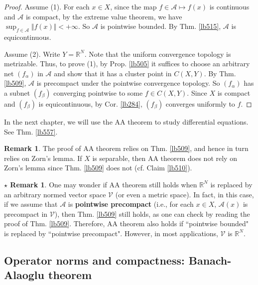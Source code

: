 \documentclass[12pt,b5paper,notitlepage]{article}
\theoremstyle{definition}
\newtheorem{rem}[df]{Remark}
\newtheorem{srem}[df]{$\star$ Remark}
\theoremstyle{plain}
\newcommand{\mc}{\mathcal}
\newcommand{\scr}{\mathscr}
\newcommand{\Rbb}{\mathbb R}
\numberwithin{equation}{section}
\begin{document}


\begin{proof}
Assume (1). For each $x\in X$, since the map $f\in\scr A\mapsto f(x)$ is continuous and $\scr A$ is compact, by the extreme value theorem, we have $\sup_{f\in\scr A}\Vert f(x)\Vert<+\infty$. So $\scr A$ is pointwise bounded. By Thm. \ref{lb515}, $\scr A$ is equicontinuous.

Assume (2). Write $Y=\Rbb^N$. Note that the uniform convergence topology is metrizable. Thus, to prove (1), by Prop. \ref{lb505} it suffices to choose an arbitrary net $(f_\alpha)$ in $\scr A$ and show that it has a cluster point in $C(X,Y)$. By Thm. \ref{lb509}, $\scr A$ is precompact under the pointwise convergence topology. So $(f_\alpha)$ has a subnet $(f_\beta)$ converging pointwise to some $f\in C(X,Y)$. Since $X$ is compact and $(f_\beta)$ is equicontinuous, by Cor. \ref{lb284}, $(f_\beta)$ converges uniformly to $f$. 
\end{proof}


In the next chapter, we will use the AA theorem to study differential equations. See Thm. \ref{lb557}.


\begin{rem}
The proof of AA theorem relies on Thm. \ref{lb509}, and hence in turn relies on Zorn's lemma. If $X$ is separable, then AA theorem does not rely on Zorn's lemma since Thm. \ref{lb509} does not (cf. Claim \ref{lb510}).
\end{rem}

\begin{srem}
One may wonder if AA theorem still holds when $\Rbb^N$ is replaced by an arbitrary normed vector space $\mc V$ (or even a metric space). In fact, in this case, if we assume that $\scr A$ is \textbf{pointwise precompact} (i.e., for each $x\in X$, $\scr A(x)$ is precompact in $\mc V$), then Thm. \ref{lb509} still holds, as one can check by reading the proof of Thm. \ref{lb509}. Therefore, AA theorem also holds if ``pointwise bounded" is replaced by ``pointwise precompact". However, in most applications, $\mc V$ is $\Rbb^N$.
\end{srem}


\subsection{Operator norms and compactness: Banach-Alaoglu theorem}\label{lb571}
\end{document}
